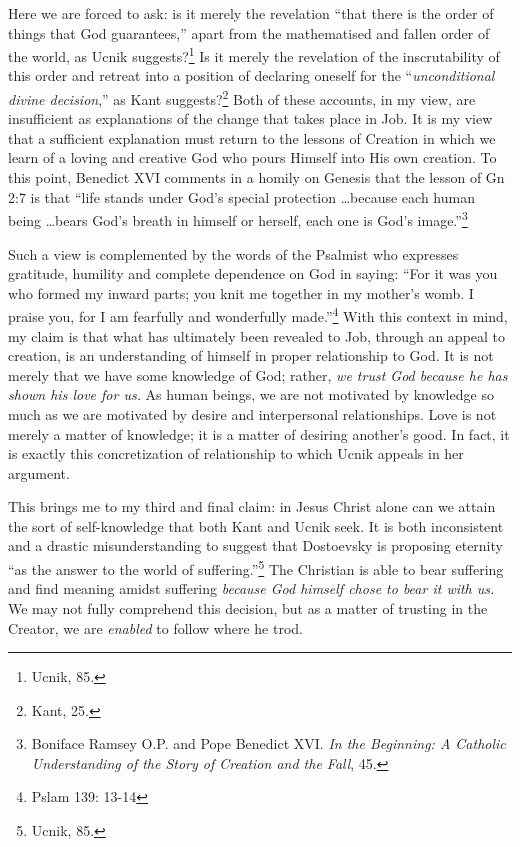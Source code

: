 \documentclass[12pt]{article}
\begin{document}
	Here we are forced to ask: is it merely the revelation ``that there is the order of things that God guarantees,'' apart from the mathematised and fallen order of the world, as Ucnik suggests?\footnote{Ucnik, 85.} Is it merely the revelation of the inscrutability of this order and retreat into a position of declaring oneself for the ``\emph{unconditional divine decision},'' as Kant suggests?\footnote{Kant, 25.} Both of these accounts, in my view, are insufficient as explanations of the change that takes place in Job. It is my view that a sufficient explanation must return to the lessons of Creation in which we learn of a loving and creative God who pours Himself into His own creation. To this point, Benedict XVI comments in a homily on Genesis that the lesson of Gn 2:7 is that ``life stands under God's special protection \ldots because each human being \ldots bears God's breath in himself or herself, each one is God's image.''\footnote{ Boniface Ramsey O.P. and Pope Benedict XVI. \emph{In the Beginning: A Catholic Understanding of the Story of Creation and the Fall}, 45.} 
	
	Such a view is complemented by the words of the Psalmist who expresses gratitude, humility and complete dependence on God in saying: ``For it was you who formed my inward parts; you knit me together in my mother's womb. I praise you, for I am fearfully and wonderfully made.''\footnote{Pslam 139: 13-14} With this context in mind, my claim is that what has ultimately been revealed to Job, through an appeal to creation, is an understanding of himself in proper relationship to God. It is not merely that we have some knowledge of God; rather, \emph{we trust God because he has shown his love for us.} As human beings, we are not motivated by knowledge so much as we are motivated by desire and interpersonal relationships. Love is not merely a matter of knowledge; it is a matter of desiring another's good. In fact, it is exactly this concretization of relationship to which Ucnik appeals in her argument. 
	
	This brings me to my third and final claim: in Jesus Christ alone can we attain the sort of self-knowledge that both Kant and Ucnik seek. It is both inconsistent and a drastic misunderstanding to suggest that Dostoevsky is proposing eternity ``as the answer to the world of suffering.''\footnote{Ucnik, 85.} The Christian is able to bear suffering and find meaning amidst suffering \emph{because God himself chose to bear it with us.} We may not fully comprehend this decision, but as a matter of trusting in the Creator, we are \emph{enabled} to follow where he trod.
	
\end{document}
